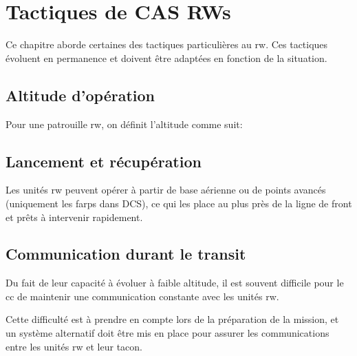 \chapter{Tactiques de CAS RWs}

\e
    \item Ce chapitre aborde certaines des tactiques particulières au \gls{rw}. Ces tactiques évoluent en permanence et doivent être adaptées en fonction de la situation.
    \item {}
\ed

\section{Altitude d’opération}

\e
    \item Pour une patrouille \acrshort{rw}, on définit l’altitude comme suit:
\ed

\section{Lancement et récupération}

\e
    \item
    Les unités \gls{rw} peuvent opérer à partir de base aérienne ou de points avancés (uniquement les \glspl{farp} dans DCS), ce qui les place au plus près de la ligne de front et prêts à intervenir rapidement.
\ed

\section{Communication durant le transit}

\e
    \item
    Du fait de leur capacité à évoluer à faible altitude, il est souvent difficile pour le \gls{cc} de maintenir une communication constante avec les unités \gls{rw}.
    \item
    Cette difficulté est à prendre en compte lors de la préparation de la mission,  et un système alternatif doit être mis en place pour assurer les communications entre les unités \gls{rw} et leur \gls{tacon}.
\ed

